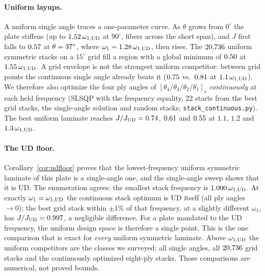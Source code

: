 \paragraph{Uniform layups.} A uniform single angle traces a one-parameter curve. As
$\theta$ grows from $0^\circ$ the plate stiffens (up to $1.52\,\omega_{1,\mathrm{UD}}$ at
$90^\circ$, fibers across the short span), and $J$ first falls to $0.57$ at
$\theta=37^\circ$, where $\omega_1=1.28\,\omega_{1,\mathrm{UD}}$, then rises. The
$20{,}736$ uniform symmetric stacks on a $15^\circ$ grid fill a region with a global
minimum of $0.50$ at $1.55\,\omega_{1,\mathrm{UD}}$. A grid envelope is not the strongest
uniform competitor: between grid points the continuous single angle already beats it
($0.75$ vs.\ $0.81$ at $1.1\,\omega_{1,\mathrm{UD}}$). We therefore also optimize the
four ply angles of $[\theta_4/\theta_3/\theta_2/\theta_1]_s$ \emph{continuously} at each
held frequency (SLSQP with the frequency equality, 22 starts from the best grid stacks,
the single-angle solution and random stacks; \texttt{stack\_continuous.py}). The best
uniform laminate reaches $J/J_{\mathrm{UD}}=0.74$, $0.61$ and $0.55$ at
$1.1$, $1.2$ and $1.3\,\omega_{1,\mathrm{UD}}$.

\paragraph{The UD floor.} Corollary~\ref{cor:udfloor} proves that the lowest-frequency uniform
symmetric laminate of this plate is a single-angle one, and the single-angle sweep shows that it is
UD. The enumeration agrees: the smallest stack frequency is $1.000\,\omega_{1,\mathrm{UD}}$. At
exactly $\omega_1=\omega_{1,\mathrm{UD}}$ the continuous stack optimum is UD itself (all ply angles
$\to0$); the best grid stack within $\pm1\%$ of that frequency, at a slightly different
$\omega_1$, has $J/J_{\mathrm{UD}}=0.997$, a negligible difference. For a plate
mandated to the UD frequency, the uniform design space is therefore a single point. This is the one
comparison that is exact for \emph{every} uniform symmetric laminate. Above $\omega_{1,\mathrm{UD}}$ the uniform
competitors are the classes we surveyed: all single angles, all $20{,}736$ grid stacks and the
continuously optimized eight-ply stacks. Those comparisons are numerical, not proved bounds.

